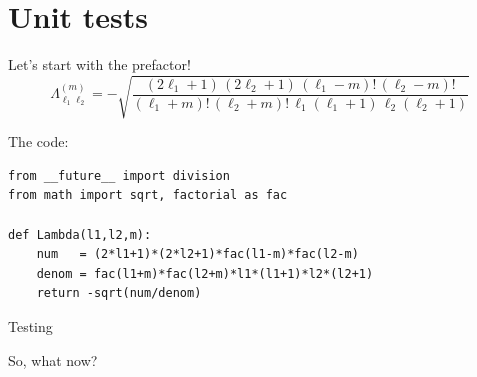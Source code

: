 \documentclass[12pt,compress,mathserif]{beamer}
\begin{document}
\section{Unit tests}

\begin{frame}[fragile]{Let's start with the prefactor!}
    \begin{equation}
    \nonumber
    \Lambda_{\ell_1 \ell_2}^{(m)} = 
    -\sqrt{ \frac{(2\ell_1+1)\,(2\ell_2+1)\,(\ell_1-m)!\,(\ell_2-m)!}{(\ell_1+m)!\, (\ell_2+m)!\, \ell_1(\ell_1+1) \, \ell_2(\ell_2+1)} }
    \end{equation}

    \vfill

    The code:
    \begin{lstlisting}
from __future__ import division
from math import sqrt, factorial as fac

def Lambda(l1,l2,m):
    num   = (2*l1+1)*(2*l2+1)*fac(l1-m)*fac(l2-m)
    denom = fac(l1+m)*fac(l2+m)*l1*(l1+1)*l2*(l2+1)
    return -sqrt(num/denom)
    \end{lstlisting}
\end{frame}

\begin{frame}{Testing}
    \begin{center}
    \huge So, what now?
    \end{center}
\end{frame}
\end{document}

